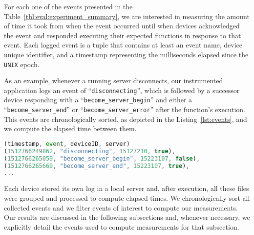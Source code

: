 For each one of the events presented in the Table~\ref{tbl:eval:experiment_summary}, we are interested in measuring the amount of time it took from when the event occurred until when devices acknowledged the event and responded executing their expected functions in response to that event. 
Each logged event is a tuple that contains at least an event name, device unique identifier, and a timestamp representing the milliseconds elapsed since the \texttt{UNIX} epoch.


As an example, whenever a running server disconnects, our instrumented application logs an event of ``{\texttt{disconnecting}}'', which is followed by a successor device responding with a ``{\texttt{become\_server\_begin}}'' and either a ``{\texttt{become\_server\_end}}'' or ``{\texttt{become\_server\_error}}'' after the function's execution. This events are chronologically sorted, as depicted in the Listing~\ref{lst:events}, and we compute the elapsed time between them.

\begin{tiny}
\begin{lstlisting}[caption={Tuples with logged events},label={lst:events}, language=JavaScript]
(timestamp, event, deviceID, server)
(1512766249862, "disconnecting", 15127210, true),
(1512766265059, "become_server_begin", 15223107, false),
(1512766265669, "become_server_end", 15223107, true),
...
\end{lstlisting}    
\end{tiny}


Each device stored its own log in a local server and, after execution, all these files were grouped and processed to compute elapsed times. We chronologically sort all collected events and we filter events of interest to compute our measurements. 
Our results are discussed in the following subsections and, whenever necessary, we explicitly detail the events used to compute measurements for that subsection.



